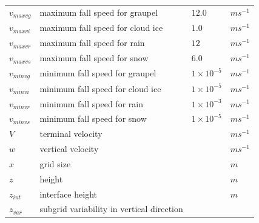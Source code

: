 \documentclass[letterpaper,titlepage,10pt]{article}
\numberwithin{equation}{section}
\begin{document}
\begin{appendices}
\begin{longtable}{p{}p{}p{}p{}}
	$v_{maxvg}$        & maximum fall speed for graupel                                                       & $12.0$                     & $m s^{-1}$ \\
	$v_{maxvi}$        & maximum fall speed for cloud ice                                                     & $1.0$                      & $m s^{-1}$ \\
	$v_{maxvr}$        & maximum fall speed for rain                                                          & $12$                       & $m s^{-1}$ \\
	$v_{maxvs}$        & maximum fall speed for snow                                                          & $6.0$                      & $m s^{-1}$ \\
	$v_{minvg}$        & minimum fall speed for graupel                                                       & $1 \times 10^{-5}$         & $m s^{-1}$ \\
	$v_{minvi}$        & minimum fall speed for cloud ice                                                     & $1 \times 10^{-5}$         & $m s^{-1}$ \\
	$v_{minvr}$        & minimum fall speed for rain                                                          & $1 \times 10^{-3}$         & $m s^{-1}$ \\
	$v_{minvs}$        & minimum fall speed for snow                                                          & $1 \times 10^{-5}$         & $m s^{-1}$ \\
	$V$                & terminal velocity                                                                    &                            & $m s^{-1}$ \\
	$w$                & vertical velocity                                                                    &                            & $m s^{-1}$ \\
	$x$                & grid size                                                                            &                            & $m$ \\
	$z$                & height                                                                               &                            & $m$ \\
	$z_{int}$          & interface height                                                                     &                            & $m$ \\
	$z_{var}$          & subgrid variability in vertical direction                                            &                            & \\

\end{longtable}
\end{appendices}
\end{document}
